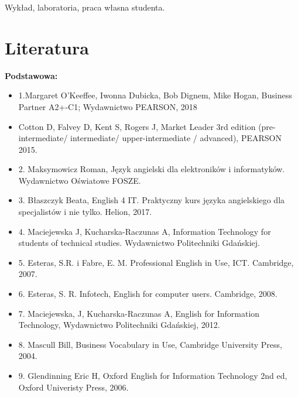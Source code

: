 \documentclass[12pt, a4paper]{article}
\begin{document}
Wykład, laboratoria, praca własna studenta.

\section{Literatura}

\textbf{Podstawowa:}
\begin{itemize}
  \item 1.Margaret O’Keeffee, Iwonna Dubicka, Bob Dignem, Mike Hogan, Business Partner A2+-C1; Wydawnictwo PEARSON, 2018
  \item Cotton D, Falvey D, Kent S, Rogers J, Market Leader 3rd edition (pre-intermediate/ intermediate/ upper-intermediate / advanced), PEARSON 2015.
  \item 2. Maksymowicz Roman, Język angielski dla elektroników i informatyków. Wydawnictwo Oświatowe FOSZE.
  \item 3. Błaszczyk Beata, English 4 IT. Praktyczny kurs języka angielskiego dla specjalistów i nie tylko. Helion, 2017.
  \item 4. Maciejewska J, Kucharska-Raczunas A, Information Technology for students of technical studies. Wydawnictwo Politechniki Gdańskiej.
  \item 5. Esteras, S.R. i Fabre, E. M. Professional English in Use, ICT. Cambridge, 2007.
  \item 6. Esteras, S. R. Infotech,  English for computer users. Cambridge, 2008.
  \item 7. Maciejewska, J, Kucharska-Raczunas A, English for Information Technology, Wydawnictwo Politechniki Gdańskiej, 2012.
  \item 8. Mascull Bill, Business Vocabulary in Use, Cambridge University Press, 2004.
  \item 9. Glendinning Eric H, Oxford English for Information Technology 2nd ed, Oxford Univeristy Press, 2006.
\end{itemize}
\end{document}
